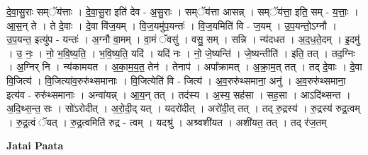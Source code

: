 \documentclass[17pt]{extarticle}
\begin{document}
दे॒वा॒सु॒राः सम्ॅय॑त्ताः । दे॒वा॒सु॒रा इति॑ देव - अ॒सु॒राः । सम्ॅय॑त्ता आसन्न् । सम्ॅय॑त्ता॒ इति॒ सम् - य॒त्ताः॒ । आ॒स॒न् ते । ते दे॒वाः । दे॒वा वि॑ज॒यम् । वि॒ज॒यमु॑प॒यन्तः॑ । वि॒ज॒यमिति॑ वि - ज॒यम् । उ॒प॒यन्तो॒ऽग्नौ । उ॒प॒यन्त॒ इत्यु॑प - यन्तः॑ । अ॒ग्नौ वा॒मम् । वा॒मं ॅवसु॑ । वसु॒ सम् । सन्नि । न्य॑दधत । अ॒द॒ध॒ते॒दम् । इ॒दमु॑ । उ॒ नः॒ । नो॒ भ॒वि॒ष्य॒ति॒ । भ॒वि॒ष्य॒ति॒ यदि॑ । यदि॑ नः । नो॒ जे॒ष्यन्ति॑ । जे॒ष्यन्तीति॑ । इति॒ तत् । तद॒ग्निः । अ॒ग्निर् नि । न्य॑कामयत । अ॒का॒म॒य॒त॒ तेन॑ । तेनाप॑ । अपा᳚क्रामत् । अ॒क्रा॒म॒त् तत् । तद् दे॒वाः । दे॒वा वि॒जित्य॑ । वि॒जित्या॑व॒रुरु॑थ्समानाः । वि॒जित्येति॑ वि - जित्य॑ । अ॒व॒रुरु॑थ्समाना॒ अनु॑ । अ॒व॒रुरु॑थ्समाना॒ इत्य॑व - रुरु॑थ्समानाः । अन्वा॑यन्न् । आ॒य॒न् तत् । तद॑स्य । अ॒स्य॒ सह॑सा । सह॒सा । आऽदि॑थ्सन्त । अ॒दि॒थ्स॒न्त॒ सः । सो॑ऽरोदीत् । अ॒रो॒दी॒द् यत् । यदरो॑दीत् । अरो॑दी॒त् तत् । तद् रु॒द्रस्य॑ । रु॒द्रस्य॑ रुद्र॒त्वम् । रु॒द्र॒त्वं ॅयत् । रु॒द्र॒त्वमिति॑ रुद्र - त्वम् । यदश्रु॑ । अश्र्वशी॑यत । अशी॑यत॒ तत् । 
तद् र॑ज॒तम् \newline

\textbf{Jatai Paata} \newline
\end{document}
